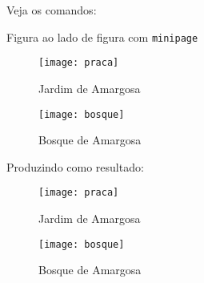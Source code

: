 Veja os comandos:

\begin{codigo}{Figura ao lado de figura com \texttt{minipage}}{\lapis}
\begin{figure}[!htbp]
	\begin{minipage}[b]{0.45\linewidth}
	\centering
	\texttt{[image: praca]}
	\caption{Jardim de Amargosa}
	\label{fig:praca}
	\end{minipage}
	\hfill
	\begin{minipage}[b]{0.45\linewidth}
	\centering
	\texttt{[image: bosque]}
	\caption{Bosque de Amargosa}
	\label{fig:bosque}
	\end{minipage}
\end{figure}
\end{codigo}

Produzindo como resultado:

\begin{figure}[!htbp]
	\begin{minipage}[b]{0.45\linewidth}
	\centering
	\texttt{[image: praca]}
	\caption{Jardim de Amargosa}
	\label{fig:praca}
	\end{minipage}
	\hfill
	\begin{minipage}[b]{0.45\linewidth}
	\centering
	\texttt{[image: bosque]}
	\caption{Bosque de Amargosa}
	\label{fig:bosque}
	\end{minipage}
\end{figure}

